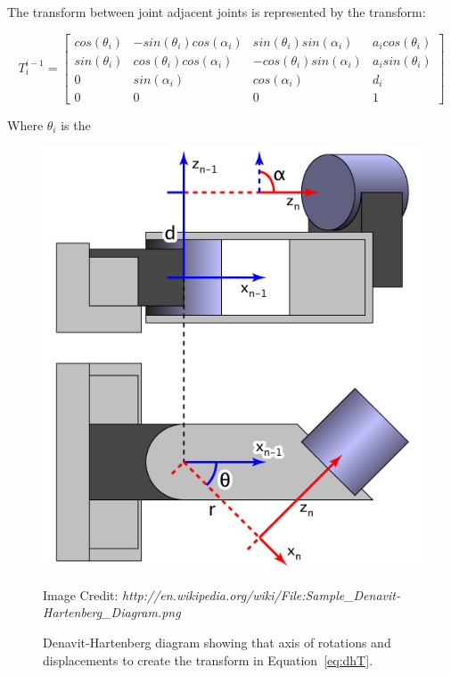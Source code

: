 The transform between joint adjacent joints is represented by the transform:

\begin{equation}\label{eq:dhT}
T_i^{i-1} = \left[ \begin{array}{cccc} 
cos(\theta_i) & -sin(\theta_i)cos(\alpha_i) &  sin(\theta_i)sin(\alpha_i)  &  a_i cos(\theta_i) \\ 
sin(\theta_i) &  cos(\theta_i)cos(\alpha_i) & -cos(\theta_i)sin(\alpha_i)  &  a_i sin(\theta_i) \\
0             &  sin(\alpha_i)              &  cos(\alpha_i)               &  d_i               \\
0             &  0                          &  0                           &  1                 
\end{array} \right]
\end{equation}

Where $\theta_i$ is the 

\begin{figure}[thpb]
  \centering
\includegraphics[width=0.5\columnwidth]{./examples/pix/Sample_Denavit-Hartenberg_Diagram.png}
\caption{Denavit-Hartenberg diagram showing that axis of rotations and displacements to create the transform in Equation~\ref{eq:dhT}.}
Image Credit: \textit{http://en.wikipedia.org/wiki/File:Sample\_Denavit-Hartenberg\_Diagram.png}
\end{figure}
